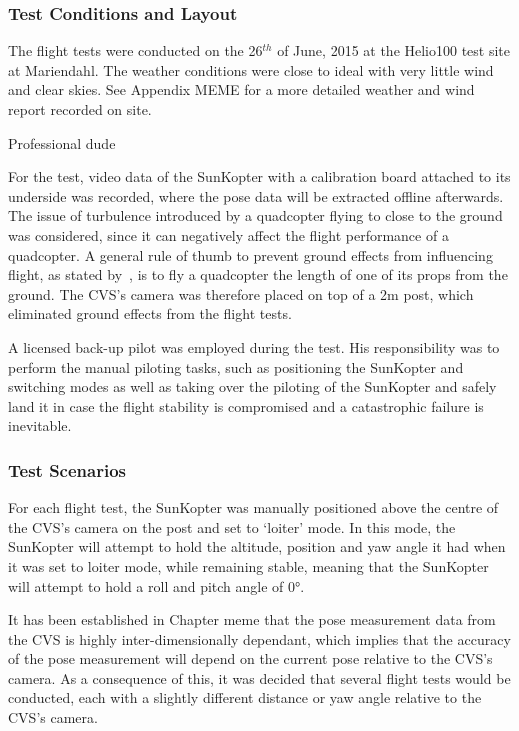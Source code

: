 \subsubsection{Test Conditions and Layout}

The flight tests were conducted on the 26$^{th}$ of June, 2015 at the Helio100 test site at Mariendahl. The weather conditions were close to ideal with very little wind and clear skies. See Appendix MEME for a more detailed weather and wind report recorded on site.

Professional dude

For the test, video data of the SunKopter with a calibration board attached to its underside was recorded, where the pose data will be extracted offline afterwards. The issue of turbulence introduced by a quadcopter flying to close to the ground was considered, since it can negatively affect the flight performance of a quadcopter. A general rule of thumb to prevent ground effects from influencing flight, as stated by~\cite{basson-flight-test}, is to fly a quadcopter the length of one of its props from the ground. The CVS's camera was therefore placed on top of a 2m post, which eliminated ground effects from the flight tests.

A licensed back-up pilot was employed during the test. His responsibility was to perform the manual piloting tasks, such as positioning the SunKopter and switching modes as well as taking over the piloting of the SunKopter and safely land it in case the flight stability is compromised and a catastrophic failure is inevitable.

\subsubsection{Test Scenarios}

For each flight test, the SunKopter was manually positioned above the centre of the CVS's camera on the post and set to `loiter' mode. In this mode, the SunKopter will attempt to hold the altitude, position and yaw angle it had when it was set to loiter mode, while remaining stable, meaning that the SunKopter will attempt to hold a roll and pitch angle of $\ang{0}$. 

It has been established in Chapter meme that the pose measurement data from the CVS is highly inter-dimensionally dependant, which implies that the accuracy of the pose measurement will depend on the current pose relative to the CVS's camera. As a consequence of this, it was decided that several flight tests would be conducted, each with a slightly different distance or yaw angle relative to the CVS's camera. 

